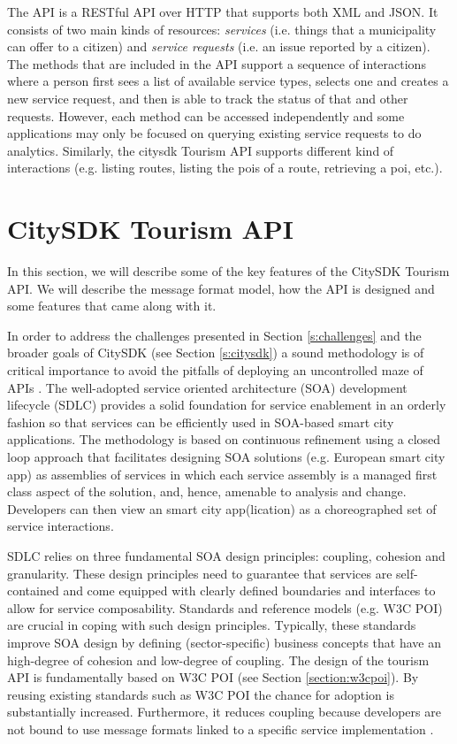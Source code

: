 \documentclass[times]{ettauth}
\begin{document}
The API is a RESTful API over HTTP that supports both XML and JSON.
It consists of two main kinds of resources: \emph{services} (i.e. things that a municipality can offer to a citizen) and \emph{service requests} (i.e. an issue reported by a citizen).
The methods that are included in the API support a sequence of interactions where a person first sees a list of available service types, selects one and creates a new service request, and then is able to track the status of that and other requests.
However, each method can be accessed independently and some applications may only be focused on querying existing service requests to do analytics.
Similarly, the \ac{citysdk} Tourism API supports different kind of interactions (e.g. listing routes, listing the \acp{poi} of a route, retrieving a \ac{poi}, etc.).


\section{CitySDK Tourism API}
\label{s:tourim-api}
In this section, we will describe some of the key features of the CitySDK Tourism API. We will describe the message format model, how the API is designed and some features that came along with it.

In order to address the challenges presented in Section \ref{s:challenges} and the broader goals of CitySDK (see Section \ref{s:citysdk}) a sound methodology is of critical importance to avoid the pitfalls of deploying an uncontrolled maze of APIs \cite{papazoglou2007,monsieur2012}. The well-adopted service oriented architecture (SOA) development lifecycle (SDLC) \cite{papazoglou2007} provides a solid foundation for service enablement in an orderly fashion so that services can be efficiently used in SOA-based smart city applications. The methodology is based on continuous refinement using a closed loop approach that facilitates designing SOA solutions (e.g. European smart city app) as assemblies of services in which each service assembly is a managed first class aspect of the solution, and, hence, amenable to analysis and change. Developers can then view an smart city app(lication) as a choreographed set of service interactions.

SDLC relies on three fundamental SOA design principles: coupling, cohesion and granularity. These design principles need to guarantee that services are self-contained and come equipped with clearly defined boundaries and interfaces to allow for service composability. Standards and reference models (e.g. W3C POI) are crucial in coping with such design principles. Typically, these standards improve SOA design by defining (sector-specific) business concepts that have an high-degree of cohesion and low-degree of coupling. The design of the tourism API is fundamentally based on W3C POI (see Section \ref{section:w3cpoi}). By reusing existing standards such as W3C POI the chance for adoption is substantially increased. Furthermore, it reduces coupling because developers are not bound to use message formats linked to a specific service implementation \cite{papazoglou2007}.
\end{document}
